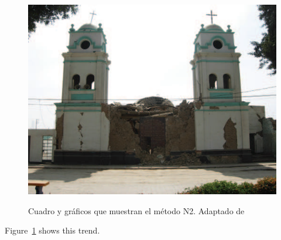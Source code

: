 \begin{figure}[ht]
  \caption{Cuadro y gráficos que muestran el método N2. Adaptado de \cite{deWaal2009}}
  \includegraphics[scale=0.36]{F_Figures/11_Chapter II/Cap2_Imagen3c.png}
	\label{fig:Figure12}
\end{figure}

Figure~\ref{fig:Figure12} shows this trend. \lipsum[16]